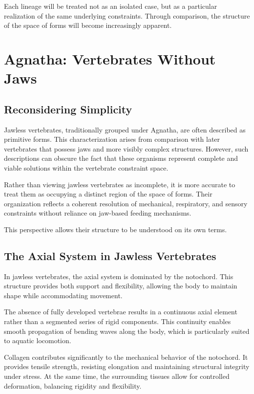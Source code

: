 \documentclass[11pt,oneside]{book}
\begin{document}
Each lineage will be treated not as an isolated case, but as a particular realization of the same underlying constraints. Through comparison, the structure of the space of forms will become increasingly apparent.

\chapter{Agnatha: Vertebrates Without Jaws}

\section{Reconsidering Simplicity}

Jawless vertebrates, traditionally grouped under Agnatha, are often described as primitive forms. This characterization arises from comparison with later vertebrates that possess jaws and more visibly complex structures. However, such descriptions can obscure the fact that these organisms represent complete and viable solutions within the vertebrate constraint space.

Rather than viewing jawless vertebrates as incomplete, it is more accurate to treat them as occupying a distinct region of the space of forms. Their organization reflects a coherent resolution of mechanical, respiratory, and sensory constraints without reliance on jaw-based feeding mechanisms.

This perspective allows their structure to be understood on its own terms.

\section{The Axial System in Jawless Vertebrates}

In jawless vertebrates, the axial system is dominated by the notochord. This structure provides both support and flexibility, allowing the body to maintain shape while accommodating movement.

The absence of fully developed vertebrae results in a continuous axial element rather than a segmented series of rigid components. This continuity enables smooth propagation of bending waves along the body, which is particularly suited to aquatic locomotion.

Collagen contributes significantly to the mechanical behavior of the notochord. It provides tensile strength, resisting elongation and maintaining structural integrity under stress. At the same time, the surrounding tissues allow for controlled deformation, balancing rigidity and flexibility.
\end{document}
